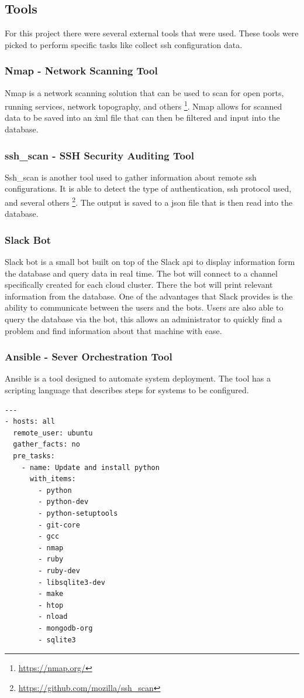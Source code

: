 \documentclass[12pt]{article}
\begin{document}
\newpage

\subsection{Tools}
For this project there were several external tools that were used. These tools were picked to perform specific tasks like collect ssh configuration data.

\subsubsection{Nmap - Network Scanning Tool}
Nmap is a network scanning solution that can be used to scan for open ports, running services, network topography, and others \footnote{\href{https://nmap.org/}{https://nmap.org/}}. Nmap allows for scanned data to be saved into an \.xml file that can then be filtered and input into the database.

\subsubsection{ssh\_scan - SSH Security Auditing Tool}
Ssh\_scan is another tool used to gather information about remote ssh configurations. It is able to detect the type of authentication, ssh protocol used, and several others \footnote{\href{https://github.com/mozilla/ssh\_scan}{https://github.com/mozilla/ssh\_scan}}. The output is saved to a json file that is then read into the database.

\subsubsection{Slack Bot}
Slack bot is a small bot built on top of the Slack api to display information form the database and query data in real time. The bot will connect to a channel specifically created for each cloud cluster. There the bot will print relevant information from the database. One of the advantages that Slack provides is the ability to communicate between the users and the bots. Users are also able to query the database via the bot, this allows an administrator to quickly find a problem and find information about that machine with ease.

\subsubsection{Ansible - Sever Orchestration Tool}
Ansible is a tool designed to automate system deployment. The tool has a scripting language that describes steps for systems to be configured.
\begin{mdframed}
\begin{lstlisting}
---
- hosts: all
  remote_user: ubuntu
  gather_facts: no
  pre_tasks:
    - name: Update and install python
      with_items:
        - python
        - python-dev
        - python-setuptools
        - git-core
        - gcc
        - nmap
        - ruby
        - ruby-dev
        - libsqlite3-dev
        - make
        - htop
        - nload
        - mongodb-org
        - sqlite3

\end{lstlisting}
\end{mdframed}
\end{document}
